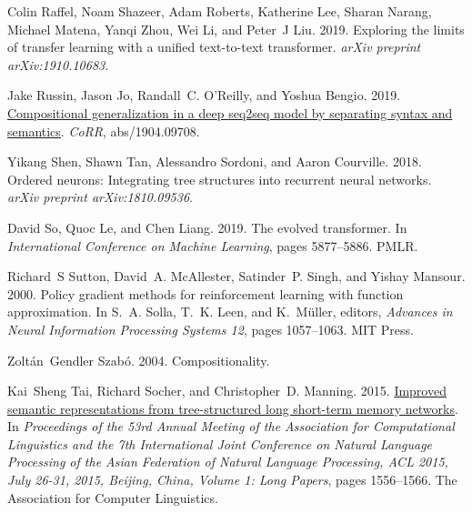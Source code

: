 \documentclass[11pt,a4paper]{article}
\begin{document}
\begin{thebibliography}{57}
Colin Raffel, Noam Shazeer, Adam Roberts, Katherine Lee, Sharan Narang, Michael
  Matena, Yanqi Zhou, Wei Li, and Peter~J Liu. 2019.
\newblock Exploring the limits of transfer learning with a unified text-to-text
  transformer.
\newblock \emph{arXiv preprint arXiv:1910.10683}.

Jake Russin, Jason Jo, Randall~C. O'Reilly, and Yoshua Bengio. 2019.
\newblock \href {http://arxiv.org/abs/1904.09708} {Compositional generalization
  in a deep seq2seq model by separating syntax and semantics}.
\newblock \emph{CoRR}, abs/1904.09708.

Yikang Shen, Shawn Tan, Alessandro Sordoni, and Aaron Courville. 2018.
\newblock Ordered neurons: Integrating tree structures into recurrent neural
  networks.
\newblock \emph{arXiv preprint arXiv:1810.09536}.

David So, Quoc Le, and Chen Liang. 2019.
\newblock The evolved transformer.
\newblock In \emph{International Conference on Machine Learning}, pages
  5877--5886. PMLR.

Richard~S Sutton, David~A. McAllester, Satinder~P. Singh, and Yishay Mansour.
  2000.
\newblock Policy gradient methods for reinforcement learning with function
  approximation.
\newblock In S.~A. Solla, T.~K. Leen, and K.~M\"{u}ller, editors,
  \emph{Advances in Neural Information Processing Systems 12}, pages
  1057--1063. MIT Press.

Zolt{\'a}n~Gendler Szab{\'o}. 2004.
\newblock Compositionality.

Kai~Sheng Tai, Richard Socher, and Christopher~D. Manning. 2015.
\newblock \href {https://doi.org/10.3115/v1/p15-1150} {Improved semantic
  representations from tree-structured long short-term memory networks}.
\newblock In \emph{Proceedings of the 53rd Annual Meeting of the Association
  for Computational Linguistics and the 7th International Joint Conference on
  Natural Language Processing of the Asian Federation of Natural Language
  Processing, {ACL} 2015, July 26-31, 2015, Beijing, China, Volume 1: Long
  Papers}, pages 1556--1566. The Association for Computer Linguistics.


\end{thebibliography}
\end{document}
